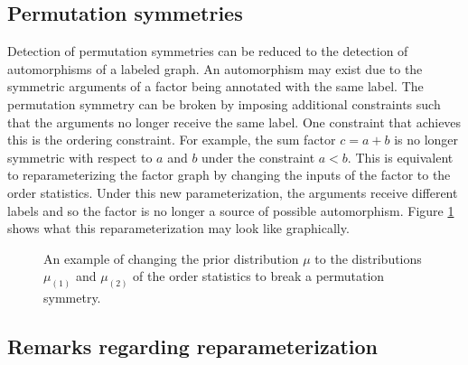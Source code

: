 \subsection{Permutation symmetries}

Detection of permutation symmetries can be reduced to the detection of automorphisms of a labeled graph. An automorphism may exist due to the symmetric arguments of a factor being annotated with the same label. The permutation symmetry can be broken by imposing additional constraints such that the arguments no longer receive the same label. One constraint that achieves this is the ordering constraint. For example, the sum factor $c=a+b$ is no longer symmetric with respect to $a$ and $b$ under the constraint $a<b$. This is equivalent to reparameterizing the factor graph by changing the inputs of the factor to the order statistics. Under this new parameterization, the arguments receive different labels and so the factor is no longer a source of possible automorphism. Figure \ref{fig:changeprior} shows what this reparameterization may look like graphically.

\begin{figure}[h]
\begin{center}
\hspace*{2cm}
\end{center}
\caption{An example of changing the prior distribution $\mu$ to the distributions $\mu_{(1)}$ and $\mu_{(2)}$ of the order statistics to break a permutation symmetry.}
\label{fig:changeprior}
\end{figure}


\subsection{Remarks regarding reparameterization}

